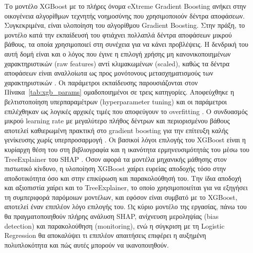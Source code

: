 Το μοντέλο XGBoost με το πλήρες όνομα eXtreme Gradient Boosting ανήκει στην
οικογένεια αλγορίθμων τεχνητής νοημοσύνης που χρησιμοποιούν δέντρα αποφάσεων.
Συγκεκριμένα, είναι υλοποίηση του αλγορίθμου Gradient Boosting. Στην πράξη, το
μοντέλο κατά την εκπαίδευσή του φτιάχνει πολλαπλά δέντρα αποφάσεων μικρού βάθους,
τα οποία χρησιμοποιεί στη συνέχεια για να κάνει προβλέψεις. Η δενδρική του αυτή
δομή είναι και ο λόγος που έγινε η επιλογή χρήσης μη κανονικοποιημένων
χαρακτηριστικών (raw features) αντί κλιμακωμένων (scaled), 
καθώς τα δέντρα αποφάσεων είναι αναλλοίωτα ως προς μονότονους μετασχηματισμούς 
των χαρακτηριστικών \citep{hastie2009}. Οι παράμετροι
εκπαίδευσης παρουσιάζονται στον Πίνακα~\ref{tab:xgb_params} ομαδοποιημένοι σε
τρεις κατηγορίες. Αποφεύχθηκε η βελτιστοποίηση υπερπαραμέτρων (hyperparameter
tuning) και οι παράμετροι επιλέχθηκαν ως λογικές αρχικές τιμές που αποφεύγουν
το overfitting \citep{probst2019tunability, bentejac2021comparative}. Ο συνδυασμός 
μικρού learning rate με μεγαλύτερο πλήθος δέντρων και περιορισμένου βάθους αποτελεί 
καθιερωμένη πρακτική στο gradient boosting για την επίτευξη καλής γενίκευσης χωρίς 
υπερπροσαρμογή \citep{hastie2009, bentejac2021comparative}.
Οι βασικοί λόγοι επιλογής του XGBoost είναι η κυρίαρχη θέση του
στη βιβλιογραφία και η ικανότητα ερμηνευσιμότητάς του μέσω του TreeExplainer του
SHAP \citep{chen2016xgboost}. Όσον αφορά τα μοντέλα μηχανικής μάθησης στον
πιστωτικό κίνδυνο, η υλοποίηση XGBoost χαίρει ευρείας αποδοχής τόσο στην
αποδοτικότητα όσο και στην επικύρωση και παρακολούθησή του. Την ίδια αποδοχή και
αξιοπιστία χαίρει και το TreeExplainer, το οποίο χρησιμοποιείται για να εξηγήσει
τη συμπεριφορά παρόμοιων μοντέλων, και εφόσον είναι συμβατό με το XGBoost,
αποτελεί έναν επιπλέον λόγο επιλογής του. Ως κύριο μοντέλο της εργασίας, πάνω
του θα πραγματοποιηθούν πλήρης ανάλυση SHAP, ανίχνευση μεροληψίας (bias
detection) και παρακολούθηση (monitoring), ενώ η σύγκριση με τη Logistic
Regression θα αποκαλύψει τι επιπλέον απαιτήσεις επιφέρει η αυξημένη πολυπλοκότητα
και πώς αυτές μπορούν να ικανοποιηθούν.


